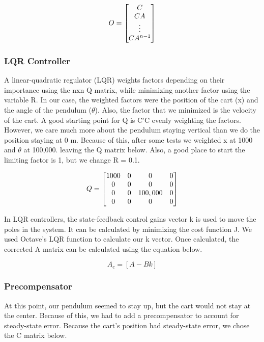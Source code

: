 \documentclass{article}
\begin{document}
 \begin{equation} 
\label{obsv}
\centering
O = \begin{bmatrix}
	C\\
	CA\\
	\vdots\\
	CA^{n-1}\\
	\end{bmatrix}
\end{equation}

\subsubsection{LQR Controller}
A linear-quadratic regulator (LQR) weights factors depending on their importance using the nxn Q matrix, while minimizing another factor using the variable R. In our case, the weighted factors were the position of the cart (x) and the angle of the pendulum ($\theta$). Also, the factor that we minimized is the velocity of the cart. A good starting point for Q is C'C evenly weighting the factors. However, we care much more about the pendulum staying vertical than we do the position staying at 0 m. Because of this, after some tests we weighted x at 1000 and $\theta$ at 100,000. leaving the Q matrix below. Also, a good place to start the limiting factor is 1, but we change R = 0.1.

 \begin{equation} 
\label{q}
\centering
Q = \begin{bmatrix}
	1000&0&0&0\\
	0&0&0&0\\
	0&0&100,000&0\\
	0&0&0&0\\
	\end{bmatrix}
\end{equation}

In LQR controllers, the state-feedback control gains vector k is used to move the poles in the system. It can be calculated by minimizing the cost function J. We used Octave's LQR function to calculate our k vector. Once calculated, the corrected A matrix can be calculated using the equation below.

\begin{equation}
\label{ac}
A_c=[A-Bk]
\end{equation}

\subsubsection{Precompensator}
At this point, our pendulum seemed to stay up, but the cart would not stay at the center. Because of this, we had to add a precompensator to account for steady-state error. Because the cart's position had steady-state error, we chose the C matrix below.
\\
\end{document}
